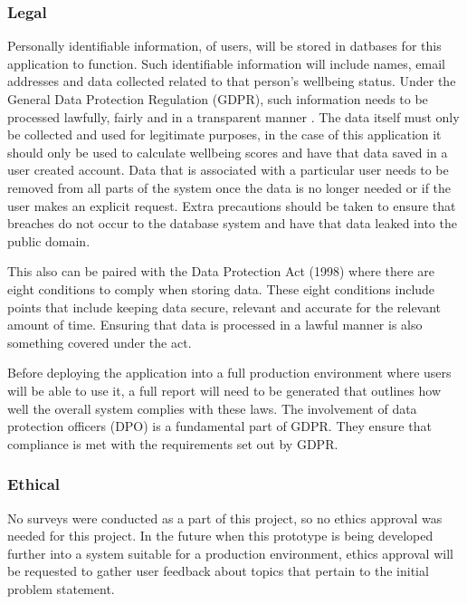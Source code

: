 \subsubsection{Legal}
Personally identifiable information, of users, will be stored in datbases for this application to function.
Such identifiable information will include names, email addresses and data collected related to that person's wellbeing status.
Under the General Data Protection Regulation (GDPR), such information needs to be processed lawfully, fairly and in a transparent manner \cite{unihighlands2018sevenprinciples}.
The data itself must only be collected and used for legitimate purposes, in the case of this application it should only be used to calculate wellbeing 
scores and have that data saved in a user created account.
Data that is associated with a particular user needs to be removed from all parts of the system once the data is no longer needed or if the user makes
an explicit request.
Extra precautions should be taken to ensure that breaches do not occur to the database system and have that data leaked into the public domain.

This also can be paired with the Data Protection Act (1998) where there are eight conditions to comply when storing data.
These eight conditions include points that include keeping data secure, relevant and accurate for the relevant amount of time. 
Ensuring that data is processed in a lawful manner is also something covered under the act.

Before deploying the application into a full production environment where users will be able to use it, a full report will need to be generated that
outlines how well the overall system complies with these laws.
The involvement of data protection officers (DPO) is a fundamental part of GDPR. 
They ensure that compliance is met with the requirements set out by GDPR.

\subsubsection{Ethical}
No surveys were conducted as a part of this project, so no ethics approval was needed for this project.
In the future when this prototype is being developed further into a system suitable for a production environment, ethics approval will be requested
to gather user feedback about topics that pertain to the initial problem statement.

